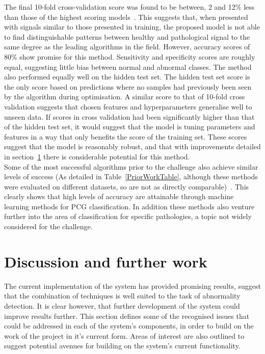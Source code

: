 \documentclass[titlepage, 12pt]{scrartcl} \usepackage{enumitem}
\begin{document}
The final 10-fold cross-validation score was found to be between, 2 and 12\%
less than those of the highest scoring models~\parencite{Zabihi2016, Homsi2017,
Kay2017}. This suggests that, when presented with signals similar to those
presented in training, the proposed model is not able to find distinguishable
patterns between healthy and pathological signal to the same degree as the
leading algorithms in the field. However, accuracy scores of 80\% show promise
for this method. Sensitivity and specificity scores are roughly equal,
suggesting little bias between normal and abnormal classes. The method also
performed equally well on the hidden test set.  The hidden test set score is
the only score based on predictions where no samples had previously been seen
by the algorithm during optimisation. A similar score to that of 10-fold cross
validation suggests that chosen features and hyperparameters generalise well to
unseen data. If scores in cross validation had been significantly higher than
that of the hidden test set, it would suggest that the model is tuning
parameters and features in a way that only benefits the score of the training
set. These scores suggest that the model is reasonably robust, and that with
improvements detailed in section~\ref{FutureWork} there is considerable
potential for this method.\\

Some of the most successful algorithms prior to the challenge also achieve
similar levels of success (As detailed in Table~\ref{PriorWorkTable}, although
these methods were evaluated on different datasets, so are not as directly
comparable)~\parencite{Ari2010, Quiceno-Manrique2010a, Maglogiannis2009}. This
clearly shows that high levels of accuracy are attainable through machine
learning methods for PCG classification. In addition these methods also venture
further into the area of classification for specific pathologies, a topic not
widely considered for the challenge. 


\section{Discussion and further work}\label{FutureWork}
The current implementation of the system has provided promising results,
suggest that the combination of techniques is well suited to the task of
abnormality detection. It is clear however, that further development of the
system could improve results further. This section defines some of the
recognised issues that could be addressed in each of the system's components,
in order to build on the work of the project in it's current form. Areas of
interest are also outlined to suggest potential avenues for building on the
system's current functionality.\\
\end{document}
